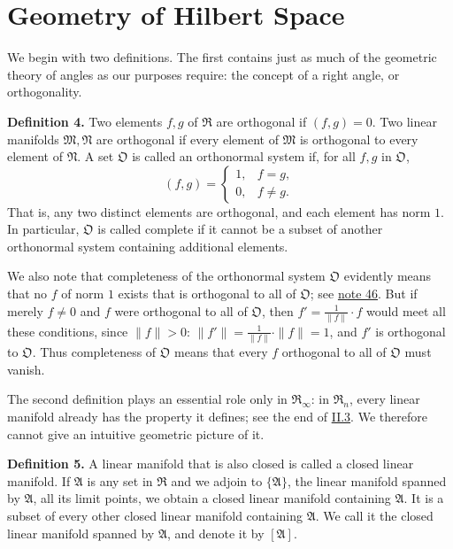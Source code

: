 \documentclass[fontsize=13pt,twoside,openany,headings=normal,parskip=false,bookmarkpackage=false,DIV=calc]{scrbook}
\begin{document}
\section{Geometry of Hilbert Space}\label{sec:II.2}

We begin with two definitions. The first contains just as much of the geometric theory of angles as our purposes require: the concept of a right angle, or orthogonality.

\leavevmode{}\textbf{Definition 4.}\label{def:II.4} Two elements $f,g$ of $\mathfrak{R}$ are orthogonal if $(f,g)=0$. Two linear manifolds $\mathfrak{M},\mathfrak{N}$ are orthogonal if every element of $\mathfrak{M}$ is orthogonal to every element of $\mathfrak{N}$. A set $\mathfrak{O}$ is called an orthonormal system if, for all $f,g$ in $\mathfrak{O}$,
\[
(f,g)=\begin{cases}1,&f=g,\\0,&f\ne g.\end{cases}
\]
\hypertarget{origpage-25}{}%
That is, any two distinct elements are orthogonal, and each element has norm $1$. In particular, $\mathfrak{O}$ is called complete if it cannot be a subset of another orthonormal system containing additional elements.

We also note that completeness of the orthonormal system $\mathfrak{O}$ evidently means that no $f$ of norm $1$ exists that is orthogonal to all of $\mathfrak{O}$; see \hyperlink{note-46}{note 46}. But if merely $f\ne0$ and $f$ were orthogonal to all of $\mathfrak{O}$, then $f'=\frac1{\|f\|}\cdot f$ would meet all these conditions, since $\|f\|>0$: $\|f'\|=\frac1{\|f\|}\cdot\|f\|=1$, and $f'$ is orthogonal to $\mathfrak{O}$. Thus completeness of $\mathfrak{O}$ means that every $f$ orthogonal to all of $\mathfrak{O}$ must vanish.

The second definition plays an essential role only in $\mathfrak{R}_\infty$: in $\mathfrak{R}_n$, every linear manifold already has the property it defines; see the end of \hyperref[sec:II.3]{II.3}. We therefore cannot give an intuitive geometric picture of it.

\leavevmode{}\textbf{Definition 5.}\label{def:II.5} A linear manifold that is also closed is called a closed linear manifold. If $\mathfrak{A}$ is any set in $\mathfrak{R}$ and we adjoin to $\{\mathfrak{A}\}$, the linear manifold spanned by $\mathfrak{A}$, all its limit points, we obtain a closed linear manifold containing $\mathfrak{A}$. It is a subset of every other closed linear manifold containing $\mathfrak{A}$. We call it the closed linear manifold spanned by $\mathfrak{A}$, and denote it by $[\mathfrak{A}]$.
\end{document}
